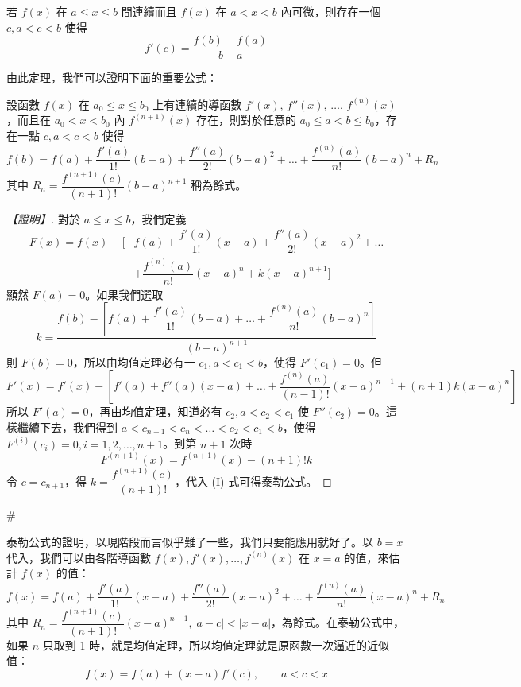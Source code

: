 \begin{theorem}[均值定理]\label{thm:b6-app4-mvt}
若 $f(x)$ 在 $a\le x\le b$ 間連續而且 $f(x)$ 在 $a<x<b$ 內可微，則存在一個 $c, a<c<b$ 使得
\[ f'(c) = \dfrac{f(b)-f(a)}{b-a} \]
\end{theorem}

由此定理，我們可以證明下面的重要公式：

\begin{theorem}[泰勒公式]\label{thm:b6-app4-taylor}
設函數 $f(x)$ 在 $a_0\le x\le b_0$ 上有連續的導函數 $f'(x)$, $f''(x)$, $\dots$, $f^{(n)}(x)$，而且在 $a_0<x<b_0$ 內 $f^{(n+1)}(x)$ 存在，則對於任意的 $a_0\le a<b\le b_0$，存在一點 $c, a<c<b$ 使得
\[ f(b) = f(a) + \dfrac{f'(a)}{1!}(b-a) + \dfrac{f''(a)}{2!}(b-a)^2 + \dots + \dfrac{f^{(n)}(a)}{n!}(b-a)^n + R_n \]
其中 $R_n = \dfrac{f^{(n+1)}(c)}{(n+1)!}(b-a)^{n+1}$ 稱為餘式。
\end{theorem}

\begin{proof}[【證明】]
對於 $a\le x\le b$，我們定義
\begin{align*}
F(x) = f(x) - \biggl[ &f(a) + \dfrac{f'(a)}{1!}(x-a) + \dfrac{f''(a)}{2!}(x-a)^2 + \dots \\
&+ \dfrac{f^{(n)}(a)}{n!}(x-a)^n + k(x-a)^{n+1} \biggr]
\end{align*}
顯然 $F(a)=0$。如果我們選取
\begin{equation}
k = \dfrac{f(b) - \left[ f(a) + \dfrac{f'(a)}{1!}(b-a) + \dots + \dfrac{f^{(n)}(a)}{n!}(b-a)^n \right]}{(b-a)^{n+1}} \tag{I} \label{eq:b6-app4-taylor-k}
\end{equation}
則 $F(b)=0$，所以由均值定理必有一 $c_1, a<c_1<b$，使得 $F'(c_1)=0$。但
\[ F'(x) = f'(x) - \left[ f'(a) + f''(a)(x-a) + \dots + \dfrac{f^{(n)}(a)}{(n-1)!}(x-a)^{n-1} + (n+1)k(x-a)^n \right] \]
所以 $F'(a)=0$，再由均值定理，知道必有 $c_2, a<c_2<c_1$ 使 $F''(c_2)=0$。這樣繼續下去，我們得到 $a<c_{n+1}<c_n<\dots<c_2<c_1<b$，使得 $F^{(i)}(c_i)=0, i=1, 2, \dots, n+1$。到第 $n+1$ 次時
\[ F^{(n+1)}(x) = f^{(n+1)}(x) - (n+1)!k \]
令 $c=c_{n+1}$，得 $k = \dfrac{f^{(n+1)}(c)}{(n+1)!}$，代入 (I) 式可得泰勒公式。
\end{proof}\hfill$\#$

泰勒公式的證明，以現階段而言似乎難了一些，我們只要能應用就好了。以 $b=x$ 代入，我們可以由各階導函數 $f(x), f'(x), \dots, f^{(n)}(x)$ 在 $x=a$ 的值，來估計 $f(x)$ 的值：
\[ f(x) = f(a) + \dfrac{f'(a)}{1!}(x-a) + \dfrac{f''(a)}{2!}(x-a)^2 + \dots + \dfrac{f^{(n)}(a)}{n!}(x-a)^n + R_n \]
其中 $R_n = \dfrac{f^{(n+1)}(c)}{(n+1)!}(x-a)^{n+1}, |a-c|<|x-a|$，為餘式。在泰勒公式中，如果 $n$ 只取到 1 時，就是均值定理，所以均值定理就是原函數一次逼近的近似值：
\[ f(x) = f(a) + (x-a)f'(c), \qquad a<c<x \]

